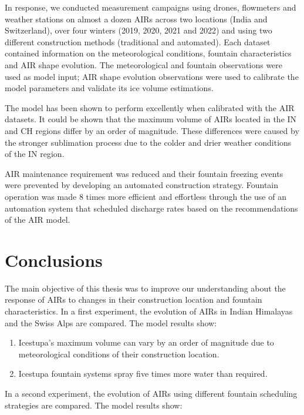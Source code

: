 In response, we conducted measurement campaigns using drones, flowmeters and weather stations on almost a dozen
AIRs across two locations (India and Switzerland), over four winters (2019, 2020, 2021 and 2022) and using two
different construction methods (traditional and automated). Each dataset contained information on the
meteorological conditions, fountain characteristics and AIR shape evolution. The
meteorological and fountain observations were used as model input; AIR shape evolution observations were used to
calibrate the model parameters and validate its ice volume estimations.

The model has been shown to perform excellently when calibrated with the AIR datasets.  It could be shown that
the maximum volume of AIRs located in the IN and CH regions differ by an order of magnitude. These differences
were caused by the stronger sublimation process due to the colder and drier weather conditions of the IN region. 

AIR maintenance requirement was reduced and their fountain freezing events were prevented by developing an
automated construction strategy. Fountain operation was made 8 times more efficient and effortless through the
use of an automation system that scheduled discharge rates based on the recommendations of the AIR model. 

\section{Conclusions}

The main objective of this thesis was to improve our understanding about the response of AIRs to changes in
their construction location and fountain characteristics. In a first experiment, the evolution of AIRs in
Indian Himalayas and the Swiss Alps are compared. The model results show: 

\begin{enumerate} 

\item Icestupa's maximum volume can vary by an order of magnitude due to meteorological
  conditions of their construction location. 

\item Icestupa fountain systems spray five times more water than required.

\end{enumerate}

In a second experiment, the evolution of AIRs using different fountain scheduling strategies are compared. The
model results show: 

